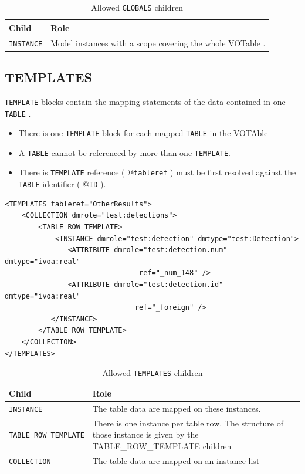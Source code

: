 \documentclass[11pt,a4paper]{ivoa}
\begin{document}
\begin{table}[!htbp]
     \begin{tabular}{|p{3cm}|p{7cm}|}
       \hline Child &  Role\\
       \hline  \texttt{INSTANCE}    &  Model instances with a scope covering the whole VOTable . \\       
       \hline 
     \end{tabular}
     \caption{Allowed  \texttt{GLOBALS} children} 
     \label{tbl:globals-children}
 \end{table}


\subsection{TEMPLATES}

\texttt{TEMPLATE} blocks contain the mapping statements of the data contained in one \texttt{TABLE} .

\begin{itemize}
    \item There is one \texttt{TEMPLATE} block for each mapped \texttt{TABLE}  in the VOTAble    
    \item A \texttt{TABLE} cannot be referenced by more than one \texttt{TEMPLATE}.
    \item  There is \texttt{TEMPLATE} reference ( @\texttt{tableref} ) must be first resolved against the \texttt{TABLE} identifier (  @\texttt{ID} ).
\end{itemize}

\begin{lstlisting}[caption={GLOBALS block example},captionpos=b]
<TEMPLATES tableref="OtherResults">
    <COLLECTION dmrole="test:detections">
        <TABLE_ROW_TEMPLATE>
            <INSTANCE dmrole="test:detection" dmtype="test:Detection">
               <ATTRIBUTE dmrole="test:detection.num" dmtype="ivoa:real"
                                ref="_num_148" />
               <ATTRIBUTE dmrole="test:detection.id" dmtype="ivoa:real"
                               ref="_foreign" />
           </INSTANCE>
        </TABLE_ROW_TEMPLATE>
    </COLLECTION>
</TEMPLATES>
\end{lstlisting}


\begin{table}[!htbp]
     \begin{tabular}{|p{4cm}|p{8cm}|}
       \hline Child &  Role\\
       \hline  \texttt{INSTANCE}    & The table data are mapped on these instances.  \\              
       \hline  \texttt{TABLE\_ROW\_TEMPLATE}    &  There is one instance per table row. The structure of those instance is given by the TABLE\_ROW\_TEMPLATE children \\              
       \hline  \texttt{COLLECTION}    &  The table data are mapped on an instance list\\       
       \hline 
     \end{tabular}
     \caption{Allowed  \texttt{TEMPLATES} children} 
     \label{tbl:templ-children}
 \end{table}
\end{document}
